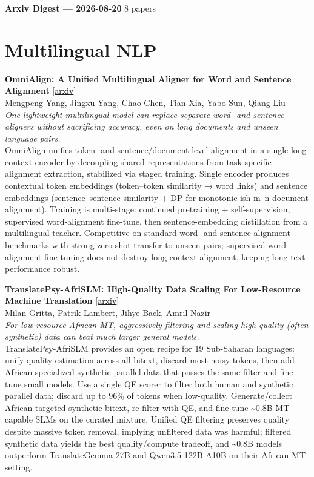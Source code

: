 \documentclass[12pt,letterpaper]{article}
\begin{document}
{\footnotesize\textbf{Arxiv Digest --- 2026-08-20} \hfill 8 papers}

\smallskip

\section*{Multilingual NLP}

{\small\textbf{OmniAlign: A Unified Multilingual Aligner for Word and Sentence Alignment}} {\scriptsize[\href{https://arxiv.org/abs/2608.18474}{arxiv}]}\\
{\scriptsize Mengpeng Yang, Jingxu Yang, Chao Chen, Tian Xia, Yabo Sun, Qiang Liu}\\

{\small\textit{One lightweight multilingual model can replace separate word- and sentence-aligners without sacrificing accuracy, even on long documents and unseen language pairs.}}\\[1pt]
{\footnotesize OmniAlign unifies token- and sentence/document-level alignment in a single long-context encoder by decoupling shared representations from task-specific alignment extraction, stabilized via staged training. Single encoder produces contextual token embeddings (token--token similarity → word links) and sentence embeddings (sentence--sentence similarity + DP for monotonic-ish m--n document alignment). Training is multi-stage: continued pretraining + self-supervision, supervised word-alignment fine-tune, then sentence-embedding distillation from a multilingual teacher. Competitive on standard word- and sentence-alignment benchmarks with strong zero-shot transfer to unseen pairs; supervised word-alignment fine-tuning does not destroy long-context alignment, keeping long-text performance robust.}

\medskip

{\small\textbf{TranslatePsy-AfriSLM: High-Quality Data Scaling For Low-Resource Machine Translation}} {\scriptsize[\href{https://arxiv.org/abs/2608.18655}{arxiv}]}\\
{\scriptsize Milan Gritta, Patrik Lambert, Jihye Back, Amril Nazir}\\

{\small\textit{For low-resource African MT, aggressively filtering and scaling high-quality (often synthetic) data can beat much larger general models.}}\\[1pt]
{\footnotesize TranslatePsy-AfriSLM provides an open recipe for 19 Sub-Saharan languages: unify quality estimation across all bitext, discard most noisy tokens, then add African-specialized synthetic parallel data that passes the same filter and fine-tune small models. Use a single QE scorer to filter both human and synthetic parallel data; discard up to 96\% of tokens when low-quality. Generate/collect African-targeted synthetic bitext, re-filter with QE, and fine-tune \textasciitilde{}0.8B MT-capable SLMs on the curated mixture. Unified QE filtering preserves quality despite massive token removal, implying unfiltered data was harmful; filtered synthetic data yields the best quality/compute tradeoff, and \textasciitilde{}0.8B models outperform TranslateGemma-27B and Qwen3.5-122B-A10B on their African MT setting.}
\end{document}
